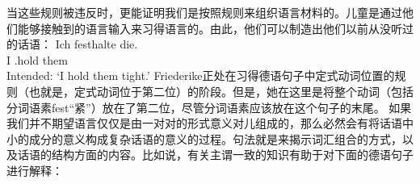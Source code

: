 当这些规则被违反时，更能证明我们是按照规则来组织语言材料的。儿童是通过他们能够接触到的语言输入来习得语言的。由此，他们可以制造出他们以前从没听过的话语：
\ea
\settowidth{}
\gll Ich festhalte die. \\
     I \particle.hold them\\
\glt Intended: `I hold them tight.'
\z
Friederike正处在习得德语句子中定式动词位置的规则（也就是，定式动词位于第二位）的阶段。但是，她在这里是将整个动词（包括分词语素fest“紧”）放在了第二位，尽管分词语素应该放在这个句子的末尾。
如果我们并不期望语言仅仅是由一对对的形式意义对儿组成的，那么必然会有将话语中小的成分的意义构成复杂话语的意义的过程。句法就是来揭示词汇组合的方式，以及话语的结构方面的内容。比如说，有关主谓一致的知识有助于对下面的德语句子进行解释：

